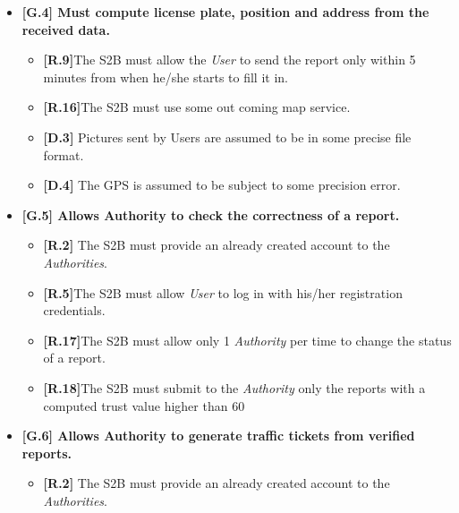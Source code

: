 \begin{itemize}
\item \textbf{{[G.4]} Must compute license plate, position and address from the received data.}

    \begin{itemize}
        
         \item \textbf{[R.9]}The S2B must allow the \textit{User} to send the report only within 5 minutes from when he/she starts to fill it in. 
         
        \item \textbf{[R.16]}The S2B must use some out coming map service.
        
         \item \textbf{[D.3]} Pictures sent by Users are assumed to be in some precise file format.
         
        \item \textbf{[D.4]} The GPS is assumed to be subject to some precision error.
    \end{itemize}
    
    
    
\item \textbf{{[G.5]} Allows Authority to check the correctness of a report.}

    \begin{itemize}
         \item \textbf{[R.2]} The S2B must provide an already created account to the \textit{Authorities}.
        
        \item \textbf{[R.5]}The S2B must allow \textit{User} to log in with his/her registration credentials.
        
        \item \textbf{[R.17]}The S2B must allow only 1 \textit{Authority} per time to change the status of a report.
        
        \item \textbf{[R.18]}The S2B must submit to the \textit{Authority} only the reports with a computed trust value higher than 60%
        
    \end{itemize}
    
    
\item \textbf{{[G.6]} Allows Authority to generate traffic tickets from verified reports.}

    \begin{itemize}
    
        \item \textbf{[R.2]} The S2B must provide an already created account to the \textit{Authorities}.
        

\end{itemize}
\end{itemize}
